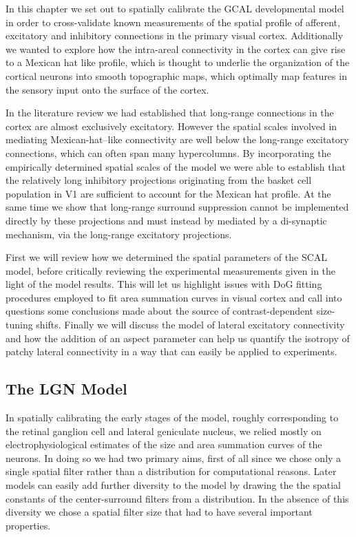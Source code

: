 In this chapter we set out to spatially calibrate the GCAL
developmental model in order to cross-validate known measurements of
the spatial profile of afferent, excitatory and inhibitory connections
in the primary visual cortex. Additionally we wanted to explore how
the intra-areal connectivity in the cortex can give rise to a Mexican
hat like profile, which is thought to underlie the organization of the
cortical neurons into smooth topographic maps, which optimally map
features in the sensory input onto the surface of the cortex.

In the literature review we had established that long-range
connections in the cortex are almost exclusively excitatory. However
the spatial scales involved in mediating Mexican-hat--like connectivity
are well below the long-range excitatory connections, which can often
span many hypercolumns. By incorporating the empirically determined
spatial scales of the model we were able to establish that the
relatively long inhibitory projections originating from the basket cell
population in V1 are sufficient to account for the Mexican hat
profile. At the same time we show that long-range surround suppression
cannot be implemented directly by these projections and must instead by
mediated by a di-synaptic mechanism, via the long-range excitatory
projections.

First we will review how we determined the spatial parameters of the
SCAL model, before critically reviewing the experimental measurements
given in the light of the model results. This will let us highlight
issues with DoG fitting procedures employed to fit area summation
curves in visual cortex and call into questions some conclusions made
about the source of contrast-dependent size-tuning shifts. Finally we
will discuss the model of lateral excitatory connectivity and how the
addition of an aspect parameter can help us quantify the isotropy of
patchy lateral connectivity in a way that can easily be applied to
experiments.

\subsection{The LGN Model}

In spatially calibrating the early stages of the model, roughly
corresponding to the retinal ganglion cell and lateral geniculate
nucleus, we relied mostly on electrophysiological estimates of the
size and area summation curves of the neurons. In doing so we had two
primary aims, first of all since we chose only a single spatial filter
rather than a distribution for computational reasons. Later models can
easily add further diversity to the model by drawing the the spatial
constants of the center-surround filters from a distribution. In the
absence of this diversity we chose a spatial filter size that had to
have several important properties.

